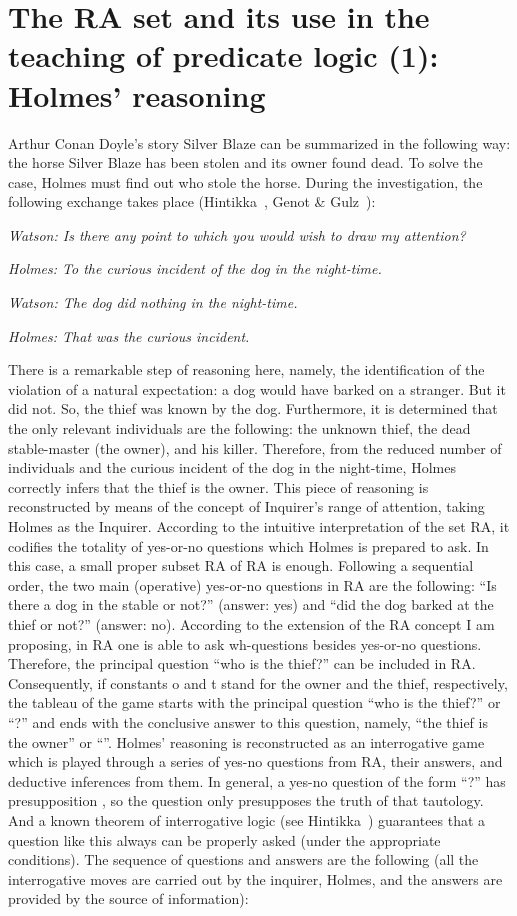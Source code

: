 \documentclass[a4paper,UKenglish]{lipics}
\begin{document}
\section{The RA set and its use in the teaching of predicate logic (1): Holmes’ reasoning}

Arthur Conan Doyle’s story Silver Blaze can be summarized in the following way: the horse Silver Blaze has been stolen and its owner found dead. To solve the case, Holmes must find out who stole the horse. During the investigation, the following exchange takes place (Hintikka~\cite{Hintikka}, Genot \& Gulz~\cite{GenotAndGulz}):

\emph{Watson: Is there any point to which you would wish to draw my attention?}

\emph{Holmes: To the curious incident of the dog in the night-time.}

\emph{Watson: The dog did nothing in the night-time.}

\emph{Holmes: That was the curious incident.}

There is a remarkable step of reasoning here, namely, the identification of the violation of a natural expectation: a dog would have barked on a stranger. But it did not. So, the thief was known by the dog. Furthermore, it is determined that the only relevant individuals are the following: the unknown thief, the dead stable-master (the owner), and his killer. Therefore, from the reduced number of individuals and the curious incident of the dog in the night-time, Holmes correctly infers that the thief is the owner. This piece of reasoning is reconstructed by means of the concept of Inquirer’s range of attention, taking Holmes as the Inquirer. According to the intuitive interpretation of the set RA, it codifies the totality of yes-or-no questions which Holmes is prepared to ask. In this case, a small proper subset RA of RA is enough. Following a sequential order, the two main (operative) yes-or-no questions in RA are the following: “Is there a dog in the stable or not?” (answer: yes) and “did the dog barked at the thief or not?” (answer: no). According to the extension of the RA concept I am proposing, in RA one is able to ask wh-questions besides yes-or-no questions. Therefore, the principal question “who is the thief?” can be included in RA. Consequently, if constants o and t stand for the owner and the thief, respectively, the tableau of the game starts with the principal question “who is the thief?” or “?” and ends with the conclusive answer to this question, namely, “the thief is the owner” or “”. Holmes’ reasoning is reconstructed as an interrogative game which is played through a series of yes-no questions from RA, their answers, and deductive inferences from them. In general, a yes-no question of the form “?” has presupposition , so the question only presupposes the truth of that tautology. And a known theorem of interrogative logic (see Hintikka~\cite{Hintikka}) guarantees that a question like this always can be properly asked (under the appropriate conditions). The sequence of questions and answers are the following (all the interrogative moves are carried out by the inquirer, Holmes, and the answers are provided by the source of information): 
\end{document}
